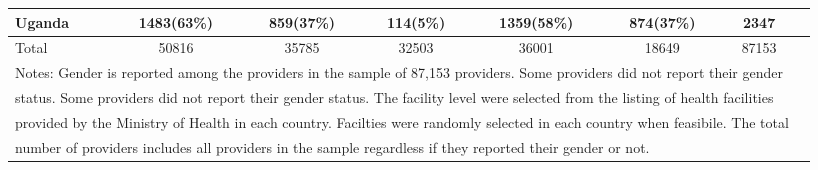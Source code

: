 \begin{tabular}{l*{7}{c}}
Uganda&                {1483(63\%)}&  {859(37\%)}&        {114(5\%)}&             {1359(58\%)}&             {874(37\%)}&             {2347}\\
\hline
Total&                 {50816}&                               {35785}&                       {32503}&                               {36001}&                               {18649}&                       {87153}\\
\hline\hline
\multicolumn{7}{l}{\footnotesize Notes: Gender is reported among the providers in the sample of 87,153 providers. Some providers did not report their gender}\\
\multicolumn{7}{l}{\footnotesize status. Some providers did not report their gender status. The facility level were selected from the listing of health facilities} \\
\multicolumn{7}{l}{\footnotesize provided by the Ministry of Health in each country. Facilties were randomly selected in each country when feasibile. The total}\\
\multicolumn{7}{l}{\footnotesize number of providers includes all providers in the sample regardless if they reported their gender or not. }\\
\end{tabular}